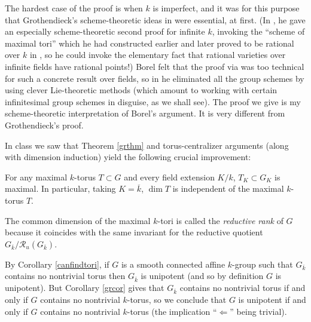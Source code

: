 \documentclass[10pt]{article}
\renewcommand{\(}{\left(}
\renewcommand{\)}{\right)}
\numberwithin{thm}{subsection}
\begin{document}
\begin{remark}\label{initrem}
The hardest case of the proof is when $k$ is imperfect, and it was
for this purpose that Grothendieck's scheme-theoretic ideas in \cite{sga3} were essential, at first.  
(In \cite[XIV, Rem.\,1.5(d)]{sga3}, he gave an especially scheme-theoretic second proof for
infinite $k$, invoking the ``scheme of maximal tori'' which he had constructed earlier
and later proved to be rational over $k$ in \cite[XIV, Thm.\,6.1]{sga3}, so he could invoke the elementary
fact that rational varieties over infinite fields have rational points!) 
Borel felt that the proof via \cite{sga3} was too technical for such a concrete result over fields, so in \cite[18.2(i)]{borel} 
he eliminated all the group schemes by using clever Lie-theoretic methods
(which amount to working with certain infinitesimal group schemes in disguise, as we shall see).
The proof we give is my scheme-theoretic interpretation of Borel's argument.
It is very different from Grothendieck's proof. 
\end{remark}

In class we saw that Theorem \ref{grthm} and torus-centralizer arguments 
(along with dimension induction) yield the following crucial
improvement: 

\begin{corollary}\label{grcor} For any maximal $k$-torus $T\subset G$ and every field extension $K/k$,
$T_K\subset G_K$ is maximal. In particular, taking $K=\overline{k}$, 
 $\dim T$ is independent of the maximal $k$-torus $T$.
 \end{corollary}
 
 The common dimension of the maximal $k$-tori is called the {\em reductive rank} of $G$
 because it coincides with the same invariant  for the reductive quotient
 $G_{\overline{k}}/\mathscr{R}_u(G_{\overline{k}})$.  
 
 \begin{remark}\label{grrem}
 By Corollary \ref{canfindtori}, if $G$ is a smooth connected affine $k$-group such that $G_{\overline{k}}$
 contains no nontrivial torus then $G_{\overline{k}}$ is unipotent (and so by definition $G$ is unipotent).
 But Corollary \ref{grcor} gives that $G_{\overline{k}}$ contains no nontrivial torus if and only if
 $G$ contains no nontrivial $k$-torus, so we conclude that $G$ is unipotent if and only if
 $G$ contains no nontrivial $k$-torus (the implication ``$\Leftarrow$'' being trivial). 
 \end{remark}
 
\end{document}
